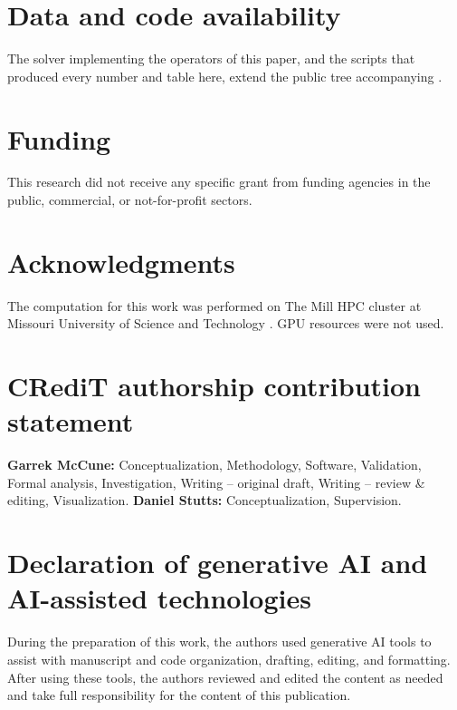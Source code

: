 \documentclass[11pt]{article}
\begin{document}
\section*{Data and code availability}
The solver implementing the operators of this paper, and the scripts
that produced every number and table here, extend the public tree
accompanying \cite{mccune2026ring}.

\section*{Funding}
This research did not receive any specific grant from funding agencies in the
public, commercial, or not-for-profit sectors.

\section*{Acknowledgments}
The computation for this work was performed on The Mill HPC cluster at
Missouri University of Science and Technology \cite{mill2024}. GPU resources
were not used.

\section*{CRediT authorship contribution statement}
\textbf{Garrek McCune:} Conceptualization, Methodology, Software, Validation,
Formal analysis, Investigation, Writing -- original draft, Writing -- review \&
editing, Visualization. \textbf{Daniel Stutts:} Conceptualization,
Supervision.

\section*{Declaration of generative AI and AI-assisted technologies}
During the preparation of this work, the authors used generative AI tools to
assist with manuscript and code organization, drafting, editing, and
formatting. After using these tools, the authors reviewed and edited the
content as needed and take full responsibility for the content of this
publication.
\normalsize
\end{document}
